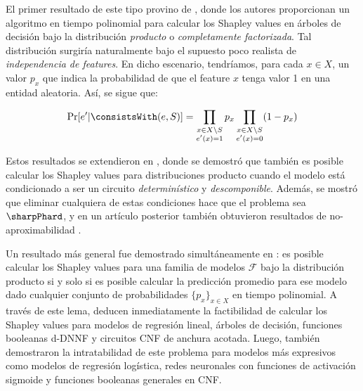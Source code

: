 
El primer resultado de este tipo provino de \cite{lundberg2020local}, donde los autores proporcionan un algoritmo en tiempo polinomial para calcular los Shapley values en árboles de decisión bajo la distribución \textit{producto} o \textit{completamente factorizada}. Tal distribución surgiría naturalmente bajo el supuesto poco realista de \textit{independencia de features}. En dicho escenario, tendríamos, para cada \(x \in X\), un valor \(p_x\) que indica la probabilidad de que el feature \(x\) tenga valor 1 en una entidad aleatoria. Así, se sigue que:

\[
\Pr[e' | \consistsWith(e, S)] = \prod_{\substack{x \in X \setminus S \\ e'(x) = 1}} p_x \prod_{\substack{x \in X \setminus S \\ e'(x) = 0}} (1-p_x) 
\]

Estos resultados se extendieron en \cite{arenas2021tractability}, donde se demostró que también es posible calcular los Shapley values para distribuciones producto cuando el modelo está condicionado a ser un circuito \textit{determinístico} y \textit{descomponible}. Además, se mostró que eliminar cualquiera de estas condiciones hace que el problema sea \(\sharpPhard\), y en un artículo posterior también obtuvieron resultados de no-aproximabilidad \cite{arenas2023complexity}.

Un resultado más general fue demostrado simultáneamente en \cite{van2022tractability}: es posible calcular los Shapley values para una familia de modelos \(\mathcal{F}\) bajo la distribución producto si y solo si es posible calcular la predicción promedio para ese modelo dado cualquier conjunto de probabilidades \(\{p_x\}_{x \in X}\) en tiempo polinomial. A través de este lema, deducen inmediatamente la factibilidad de calcular los Shapley values para modelos de regresión lineal, árboles de decisión, funciones booleanas d-DNNF y circuitos CNF de anchura acotada. Luego, también demostraron la intratabilidad de este problema para modelos más expresivos como modelos de regresión logística, redes neuronales con funciones de activación sigmoide y funciones booleanas generales en CNF.

